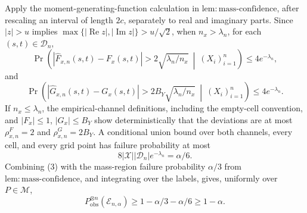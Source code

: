 Apply the moment-generating-function calculation in
\(\mathrm{lem{:}mass\text{-}confidence}\), after rescaling an interval of
length \(2c\), separately to real and imaginary parts.  Since
\(|z|>u\) implies
\(\max\{|\operatorname{Re}z|,|\operatorname{Im}z|\}>u/\sqrt2\), when
\(n_x>\lambda_n\), for each \((s,t)\in\mathcal D_n\),
\[
 \Pr\left(
 |\widehat F_{x,n}(s,t)-F_x(s,t)|
 >2\sqrt{\lambda_n/n_x}\ \middle|\ (X_i)_{i=1}^n
 \right)\le4e^{-\lambda_n},                                       \tag{1}
\]
and
\[
 \Pr\left(
 |\widehat G_{x,n}(s,t)-G_x(s,t)|
 >2B_Y\sqrt{\lambda_n/n_x}\ \middle|\ (X_i)_{i=1}^n
 \right)\le4e^{-\lambda_n}.                                       \tag{2}
\]
If \(n_x\le\lambda_n\), the empirical-channel definitions, including the
empty-cell convention, and \(|F_x|\le1\), \(|G_x|\le B_Y\) show
deterministically that the deviations are at most
\(\rho^F_{x,n}=2\) and \(\rho^G_{x,n}=2B_Y\).  A conditional union bound
over both channels, every cell, and every grid point has failure probability
at most
\[
 8|\mathcal X||\mathcal D_n|e^{-\lambda_n}=\alpha/6.               \tag{3}
\]
Combining (3) with the mass-region failure probability \(\alpha/3\) from
\(\mathrm{lem{:}mass\text{-}confidence}\), and integrating over the labels,
gives, uniformly over \(P\in\mathcal M\),
\[
 P_{\mathrm{obs}}^{\otimes n}(\mathcal E_{n,\alpha})
 \ge1-\alpha/3-\alpha/6\ge1-\alpha.                               \tag{4}
\]

